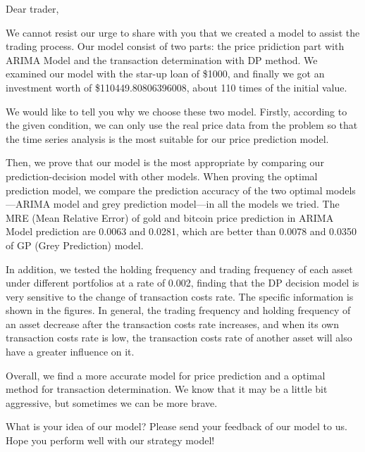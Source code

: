 \documentclass{mcmthesis}
\begin{document}
\newpage
\linespread{1}
\begin{memo}[Memorandum]
Dear trader,
\setlength{\parindent}{2em} %
\par We cannot resist our urge to share with you that we created a model to assist the trading process. Our model consist of two parts: the price pridiction part with ARIMA Model and the transaction determination with DP method. We examined our model with the star-up loan of \$1000, and finally we got an investment worth of \$110449.80806396008, about 110 times of the initial value.
\par We would like to tell you why we choose these two model. Firstly, according to the given condition, we can only use the real price data from the problem so that the time series analysis is the most suitable for our price prediction model.
\par Then, we prove that our model is the most appropriate by comparing our prediction-decision model with other models. When proving the optimal prediction model, we compare the prediction accuracy of the two optimal models---ARIMA model and grey prediction model---in all the models we tried. The MRE (Mean Relative Error) of gold and bitcoin price prediction in ARIMA Model prediction are 0.0063 and 0.0281, which are better than 0.0078 and 0.0350 of GP (Grey Prediction) model. 
\par In addition, we tested the holding frequency and trading frequency of each asset under different portfolios at a rate of 0.002, finding that the DP decision model is very sensitive to the change of transaction costs rate. The specific information is shown in the figures. In general, the trading frequency and holding frequency of an asset decrease after the transaction costs rate increases, and when its own transaction costs rate is low, the transaction costs rate of another asset will also have a greater influence on it.
\par Overall, we find a more accurate model for price prediction and a optimal method for transaction determination. We know that it may be a little bit aggressive, but sometimes we can be more brave.
\par What is your idea of our model? Please send your feedback of our model to us. Hope you perform well with our strategy model!
\end{memo}
\end{document}
